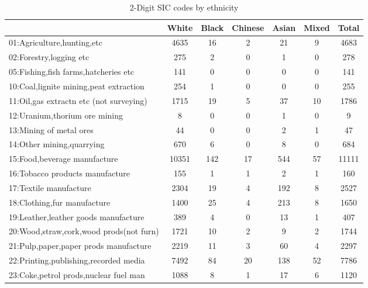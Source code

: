 {
\def\sym#1{\ifmmode^{#1}\else\(^{#1}\)\fi}
\begin{longtable}{l*{6}{c}}
\caption{2-Digit SIC codes by ethnicity}\\
\hline\hline\endfirsthead\hline\endhead\hline\endfoot\endlastfoot
          &    White&    Black&  Chinese&    Asian&    Mixed&    Total\\
\hline
01:Agriculture,hunting,etc&     4635&       16&        2&       21&        9&     4683\\
02:Forestry,logging etc&      275&        2&        0&        1&        0&      278\\
05:Fishing,fish farms,hatcheries etc&      141&        0&        0&        0&        0&      141\\
10:Coal,lignite mining,peat extraction&      254&        1&        0&        0&        0&      255\\
11:Oil,gas extractn etc (not surveying)&     1715&       19&        5&       37&       10&     1786\\
12:Uranium,thorium ore mining&        8&        0&        0&        1&        0&        9\\
13:Mining of metal ores&       44&        0&        0&        2&        1&       47\\
14:Other mining,quarrying&      670&        6&        0&        8&        0&      684\\
15:Food,beverage manufacture&    10351&      142&       17&      544&       57&    11111\\
16:Tobacco products manufacture&      155&        1&        1&        2&        1&      160\\
17:Textile manufacture&     2304&       19&        4&      192&        8&     2527\\
18:Clothing,fur manufacture&     1400&       25&        4&      213&        8&     1650\\
19:Leather,leather goods manufacture&      389&        4&        0&       13&        1&      407\\
20:Wood,straw,cork,wood prods(not furn)&     1721&       10&        2&        9&        2&     1744\\
21:Pulp,paper,paper prods manufacture&     2219&       11&        3&       60&        4&     2297\\
22:Printing,publishing,recorded media&     7492&       84&       20&      138&       52&     7786\\
23:Coke,petrol prods,nuclear fuel man&     1088&        8&        1&       17&        6&     1120\\

\end{longtable}}
